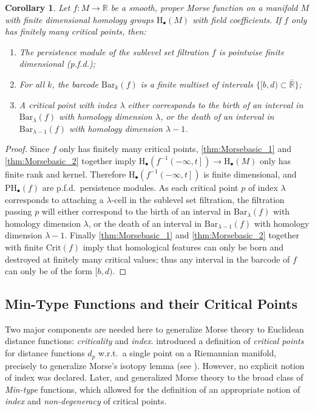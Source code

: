\documentclass[11pt]{article}
\newcommand{\R}{\mathbb{R}}
\newcommand{\PHf}[2]{\mathrm{PH}_{#1}\left( {#2} \right)}
\newcommand{\Barc}[2]{\mathrm{Bar}_{#1}\left( {#2} \right)}
\renewcommand{\Bar}{\mathrm{Bar}}
\newcommand{\sublevel}[2]{{#1}^{-1}\left(-\infty, {#2}\right]}
\renewcommand{\H}{\mathrm{H}}
\theoremstyle{plain}
\newtheorem{cor}{Corollary}
\theoremstyle{definition}
\theoremstyle{remark}
\begin{document}
\begin{cor} 
\label{cor:PM_morse_function_tame} Let $f: M \to \R$ be a smooth, proper Morse function on a manifold $M$ with finite dimensional homology groups $\H_\bullet(M)$ with field coefficients. If $f$ only has finitely many critical points, then:
\begin{enumerate}[label = (\roman*)]
    \item The persistence module of the sublevel set filtration $f$ is pointwise finite dimensional (p.f.d.);
    \item For all $k$, the barcode $\Bar_k(f)$ is a finite multiset of intervals $\{ [b,d) \subset \bar{\R} \}$;
    \item A critical point with index $\lambda$ either corresponds to the birth of an interval in $\Barc{\lambda}{f}$ with homology dimension $\lambda$, or the death of an interval in $\Barc{\lambda-1}{f}$ with homology dimension $\lambda - 1$.
\end{enumerate} 
\end{cor}
\begin{proof}
Since $f$ only has finitely many critical points, \ref{thm:Morsebasic_1} and \ref{thm:Morsebasic_2} together imply $\H_\bullet(\sublevel{f}{t}) \to \H_\bullet(M)$ only has finite rank and kernel. Therefore $\H_\bullet(\sublevel{f}{t})$ is finite dimensional, and $\PHf{\bullet}{f}$ are p.f.d.~persistence modules. As each critical point $p$ of index $\lambda$ corresponds to attaching a $\lambda$-cell in the sublevel set filtration, the filtration passing $p$ will either correspond to the birth of an interval in $\Barc{\lambda}{f}$ with homology dimension $\lambda$, or the death of an interval in $\Barc{\lambda-1}{f}$ with homology dimension $\lambda - 1$. Finally \ref{thm:Morsebasic_1} and \ref{thm:Morsebasic_2} together with finite $\mathrm{Crit}(f)$ imply that homological features can only be born and destroyed at finitely many critical values; thus any interval in the barcode of $f$ can only be of the form $ [b,d) $. 
\end{proof}

\subsection{Min-Type Functions and their Critical Points}
\label{sec:min-type}

Two major components are needed here to generalize Morse theory to Euclidean distance functions: \textit{criticality} and \textit{index}. \cite{grove_generalized_1977} introduced a definition of \textit{critical points} for distance functions $d_p$ w.r.t.~a single point on a Riemannian manifold, precisely to generalize Morse's isotopy lemma (see \citep{cheeger_critical_1991, grove_critical_1993}). 
However, no explicit notion of index was declared. 
Later, \cite{gershkovich_singularity_1997} and \cite{gershkovich_morse_1997} 
generalized Morse theory to the broad class of \emph{Min-type} functions, which allowed for the definition of an appropriate notion of \textit{index} and \textit{non-degeneracy} of critical points.
\end{document}

